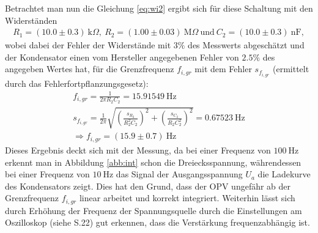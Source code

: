 Betrachtet man nun die Gleichung \ref{eq:wi2} ergibt sich für diese Schaltung mit den Widerständen 
\begin{gather*}
    R_1 = (10.0 \pm 0.3)~\text{k}\Omega,~R_2 = (1.00 \pm 0.03)~\text{M}\Omega~\text{und}~C_2 = (10.0 \pm 0.3)~\text{nF},
\end{gather*}
wobei dabei der Fehler der Widerstände mit $3\%$ des Messwerts abgeschätzt und der Kondensator einen vom Hersteller angegebenen Fehler von $2.5\%$ des angegeben Wertes hat, für die Grenzfrequenz $f_{i,gr}$ mit dem Fehler $s_{f_{i,gr}}$ (ermittelt durch das Fehlerfortpflanzungsgesetz):
\begin{gather}
    f_{i,gr} = \frac{1}{2\pi R_2 C_2} = 15.91549~\text{Hz}\\[0.5cm]
    s_{f_{i,gr}} = \frac{1}{2\pi}\sqrt{\left(\frac{s_{R_2}}{R_2^2 C_2}\right)^2 + \left(\frac{s_{C_2}}{R_2 C_2^2}\right)^2} = 0.67523~\text{Hz}\\[0.5cm]
    \Rightarrow \boxed{f_{i,gr} = (15.9 \pm 0.7)~\text{Hz}}
\end{gather}
Dieses Ergebnis deckt sich mit der Messung, da bei einer Frequenz von $100~\text{Hz}$ erkennt man in Abbildung \ref{abb:int} schon die Dreiecksspannung, währendessen bei einer Frequenz von $10~\text{Hz}$ das Signal der Ausgangsspannung $U_a$ die Ladekurve des Kondensators zeigt. Dies hat den Grund, dass der OPV ungefähr ab der Grenzfrequenz $f_{i,gr}$ linear arbeitet und korrekt integriert. Weiterhin lässt sich durch Erhöhung der Frequenz der Spannungsquelle durch die Einstellungen am Oszilloskop (siehe S.22) gut erkennen, dass die Verstärkung frequenzabhängig ist.
\newpage


